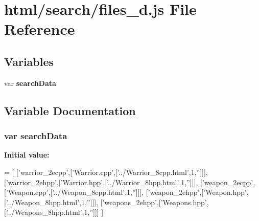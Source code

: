 \section{html/search/files\-\_\-d.js File Reference}
\label{files__d_8js}
\subsection*{Variables}
\begin{DoxyCompactItemize}
\item 
var {\bf search\-Data}
\end{DoxyCompactItemize}


\subsection{Variable Documentation}
\subsubsection[{search\-Data}]{\setlength{\rightskip}{0pt plus 5cm}var search\-Data}\label{files__d_8js_ad01a7523f103d6242ef9b0451861231e}
{\bfseries Initial value\-:}
\begin{DoxyCode}
=
[
  [\textcolor{stringliteral}{'warrior\_2ecpp'},[\textcolor{stringliteral}{'Warrior.cpp'},[\textcolor{stringliteral}{'../Warrior\_8cpp.html'},1,\textcolor{stringliteral}{''}]]],
  [\textcolor{stringliteral}{'warrior\_2ehpp'},[\textcolor{stringliteral}{'Warrior.hpp'},[\textcolor{stringliteral}{'../Warrior\_8hpp.html'},1,\textcolor{stringliteral}{''}]]],
  [\textcolor{stringliteral}{'weapon\_2ecpp'},[\textcolor{stringliteral}{'Weapon.cpp'},[\textcolor{stringliteral}{'../Weapon\_8cpp.html'},1,\textcolor{stringliteral}{''}]]],
  [\textcolor{stringliteral}{'weapon\_2ehpp'},[\textcolor{stringliteral}{'Weapon.hpp'},[\textcolor{stringliteral}{'../Weapon\_8hpp.html'},1,\textcolor{stringliteral}{''}]]],
  [\textcolor{stringliteral}{'weapons\_2ehpp'},[\textcolor{stringliteral}{'Weapons.hpp'},[\textcolor{stringliteral}{'../Weapons\_8hpp.html'},1,\textcolor{stringliteral}{''}]]]
]
\end{DoxyCode}
